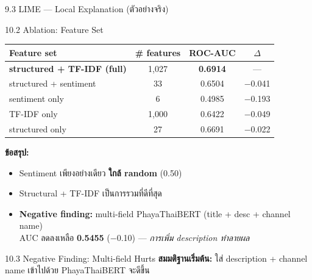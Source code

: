 \documentclass[aspectratio=169,11pt,xcolor=dvipsnames]{beamer}
\newcommand{\hl}[1]{\textcolor{kmitlOrange}{\textbf{#1}}}
\begin{document}
\begin{frame}{9.3 LIME — Local Explanation (ตัวอย่างจริง)}
\begin{center}
\begin{frame}{10.2 Ablation: Feature Set}
  \begin{center}
    \begin{tabular}{lccc}
      \toprule
      \textbf{Feature set} & \textbf{\# features} & \textbf{ROC-AUC} & \textbf{$\Delta$}\\
      \midrule
      \hl{structured + TF-IDF (full)} & 1{,}027 & \textbf{0.6914} & ---\\
      structured + sentiment          & 33      & 0.6504 & $-$0.041\\
      sentiment only                  & 6       & 0.4985 & $-$0.193\\
      TF-IDF only                     & 1{,}000 & 0.6422 & $-$0.049\\
      structured only                 & 27      & 0.6691 & $-$0.022\\
      \bottomrule
    \end{tabular}
  \end{center}
  \vspace{0.4em}
  \textbf{ข้อสรุป:}
  \begin{itemize}
    \item Sentiment เพียงอย่างเดียว \hl{ใกล้ random} (0.50)
    \item Structural + TF-IDF เป็นการรวมที่ดีที่สุด
    \item \hl{Negative finding:} multi-field PhayaThaiBERT (title + desc + channel name) \\
       AUC ลดลงเหลือ \hl{0.5455} ($-$0.10) — \emph{การเพิ่ม description ทำลายผล}
  \end{itemize}
\end{frame}

\begin{frame}{10.3 Negative Finding: Multi-field Hurts}
  \textbf{สมมติฐานเริ่มต้น:} ใส่ description + channel name เข้าไปด้วย PhayaThaiBERT จะดีขึ้น
  \vspace{0.3em}


\end{frame}
\end{center}
\end{frame}
\end{document}
